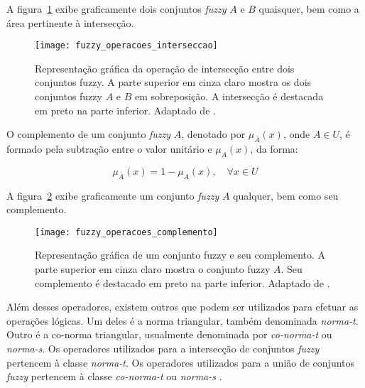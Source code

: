 A figura~\ref{fig:fuzzy_operacoes_interseccao} exibe graficamente dois conjuntos \emph{fuzzy} $A$ e $B$ quaisquer, bem como a área pertinente à intersecção.

\begin{figure}[!h]
  \centering
  \texttt{[image: fuzzy\_operacoes\_interseccao]}
  \caption[Operação de intersecção entre dois conjuntos \emph{fuzzy}]{Representação gráfica da operação de intersecção entre dois conjuntos fuzzy. A parte superior em cinza claro mostra os dois conjuntos fuzzy $A$ e $B$ em sobreposição. A intersecção é destacada em preto na parte inferior. Adaptado de \citet{vrusias:06}.}
  \label{fig:fuzzy_operacoes_interseccao}
\end{figure}

\begin{defn}
\label{def:conjunto_fuzzy_complemento}
O complemento de um conjunto \emph{fuzzy} $A$, denotado por $\mu_{\bar{A}}(x)$, onde $A \in U$, é formado pela subtração entre o valor unitário e $\mu_A(x)$, da forma:

\begin{equation}
  \mu_{\bar{A}}(x) = 1 - \mu_A(x), \quad \forall x \in U
\end{equation}
\end{defn}

A figura~\ref{fig:fuzzy_operacoes_complemento} exibe graficamente um conjunto \emph{fuzzy} $A$ qualquer, bem como seu complemento.

\begin{figure}[!h]
  \centering
  \texttt{[image: fuzzy\_operacoes\_complemento]}
  \caption[Conjunto \emph{fuzzy} e seu complemento]{Representação gráfica de um conjunto fuzzy e seu complemento. A parte superior em cinza claro mostra o conjunto fuzzy $A$. Seu complemento é destacado em preto na parte inferior. Adaptado de \citet{vrusias:06}.}
  \label{fig:fuzzy_operacoes_complemento}
\end{figure}

Além desses operadores, existem outros que podem ser utilizados para efetuar as operações lógicas. Um deles é a norma triangular, também denominada \emph{norma-t}. Outro é a co-norma triangular, usualmente denominada por \emph{co-norma-t} ou \emph{norma-s}. Os operadores utilizados para a intersecção de conjuntos \emph{fuzzy} pertencem à classe \emph{norma-t}. Os operadores utilizados para a união de conjuntos \emph{fuzzy} pertencem à classe \emph{co-norma-t} ou \emph{norma-s} \citep{zimmermann:01}.

